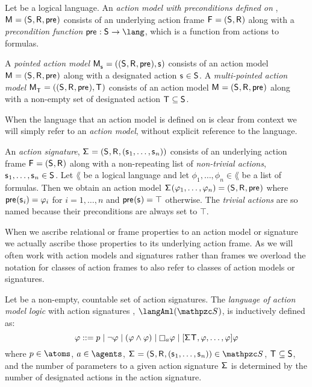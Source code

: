 \begin{definition}
Let \lang{} be a logical language.
An {\em action model with preconditions defined on \lang{}}, $\aModelAndTuple$ consists of an underlying action frame $\aFrameAndTuple$ along with a {\em precondition function} $\aPrecondition : \aStates \to \lang$, which is a function from actions to formulas.

A {\em pointed action model} $\aPModelAndTuple{\aStateS}$ consists of an action model $\aModelAndTuple$ along with a designated action $\aStateS \in \aStates$.
A {\em multi-pointed action model} $\aPModelAndTuple{\aStatesT}$ consists of an action model $\aModelAndTuple$ along with a non-empty set of designated action $\aStatesT \subseteq \aStates$.
\end{definition}

When the language that an action model is defined on is clear from context we will simply refer to an {\em action model}, without explicit reference to the language.

\begin{definition}
An {\em action signature}, $\aSignatureAndTuple$ consists of an underlying action frame $\aFrameAndTuple$ along with a non-repeating list of {\em non-trivial actions}, $\aStateS_1, \dots, \aStateS_n \in \aStates$.
Let $\lang$ be a logical language and let $\phi_1, \dots, \phi_n \in \lang$ be a list of formulas.
Then we obtain an action model $\aSignature(\phi_1, \dots, \phi_n) = \aModelTuple$ where $\aPrecondition(\aStateS_i) = \phi_i$ for $i = 1, \dots, n$ and $\aPrecondition(\aStateS) = \top$ otherwise.
The {\em trivial actions} are so named because their preconditions are always set to $\top$.
\end{definition}

When we ascribe relational or frame properties to an action model or signature we actually ascribe those properties to its underlying action frame.
As we will often work with action models and signatures rather than frames we overload the notation for classes of action frames to also refer to classes of action models or signatures.

\begin{definition}
Let \aSignatureFamily{} be a non-empty, countable set of action signatures.
The {\em language of action model logic} with action signatures \aSignatureFamily{}, $\langAml(\aSignatureFamily)$, is inductively defined as:
$$
\phi ::=
    \atomP \mid
    \lnot \phi \mid
    (\phi \land \phi) \mid
    \necessaryA \phi \mid
    \actionA{\aSignature \aStatesT, \phi, \dots, \phi} \phi\\
$$
where $\atomP \in \atoms$, $\agentA \in \agents$, $\aSignatureAndTuple \in \aSignatureFamily$, $\aStatesT \subseteq \aStates$, and the number of parameters to a given action signature $\aSignature$ is determined by the number of designated actions in the action signature.
\end{definition}

